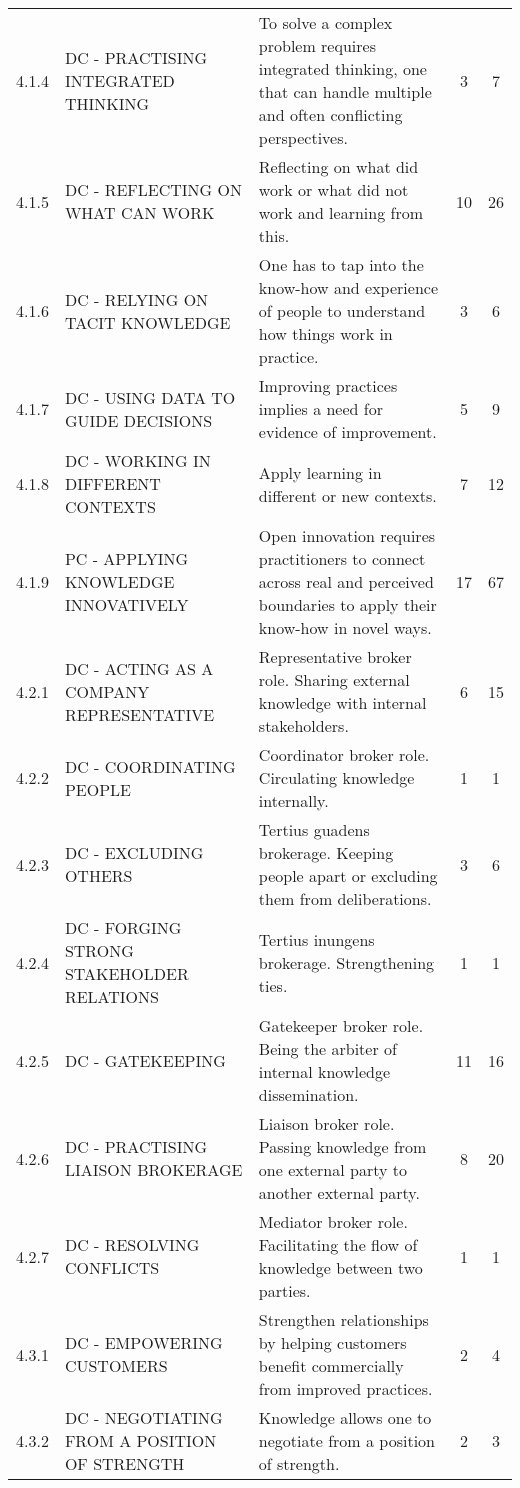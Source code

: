 \begin{landscape}
\begin{longtable}[c]{@{}ll p{6cm}cc@{}}
4.1.4 & DC - PRACTISING INTEGRATED THINKING & To solve a complex problem requires integrated thinking, one that can handle multiple and often conflicting perspectives. & 3 & 7 \\
4.1.5 & DC - REFLECTING ON WHAT CAN WORK & Reflecting on what did work or what did not work and learning from this. & 10 & 26 \\
4.1.6 & DC - RELYING ON TACIT KNOWLEDGE & One has to tap into the know-how and experience of people to understand how things work in practice. & 3 & 6 \\
4.1.7 & DC - USING DATA TO GUIDE DECISIONS & Improving practices implies a need for evidence of improvement. & 5 & 9 \\
4.1.8 & DC - WORKING IN DIFFERENT CONTEXTS & Apply learning in different or new contexts. & 7 & 12 \\
4.1.9 & PC - APPLYING KNOWLEDGE INNOVATIVELY & Open innovation requires practitioners to connect across real and perceived boundaries to apply their know-how in novel ways. & 17 & 67 \\
4.2.1 & DC - ACTING AS A COMPANY REPRESENTATIVE & Representative broker role. Sharing external knowledge with internal stakeholders. & 6 & 15 \\
4.2.2 & DC - COORDINATING PEOPLE & Coordinator broker role. Circulating knowledge internally. & 1 & 1 \\
4.2.3 & DC - EXCLUDING OTHERS & Tertius guadens brokerage. Keeping people apart or excluding them from deliberations. & 3 & 6 \\
4.2.4 & DC - FORGING STRONG STAKEHOLDER RELATIONS & Tertius inungens brokerage. Strengthening ties. & 1 & 1 \\
4.2.5 & DC - GATEKEEPING & Gatekeeper broker role. Being the arbiter of internal knowledge dissemination. & 11 & 16 \\
4.2.6 & DC - PRACTISING LIAISON BROKERAGE & Liaison broker role. Passing knowledge from one external party to another external party. & 8 & 20 \\
4.2.7 & DC - RESOLVING CONFLICTS & Mediator broker role. Facilitating the flow of knowledge between two parties. & 1 & 1 \\
4.3.1 & DC - EMPOWERING CUSTOMERS & Strengthen relationships by helping customers benefit commercially from improved practices. & 2 & 4 \\
4.3.2 & DC - NEGOTIATING FROM A POSITION OF STRENGTH & Knowledge allows one to negotiate from a position of strength. & 2 & 3 \\

\end{longtable}
\end{landscape}
